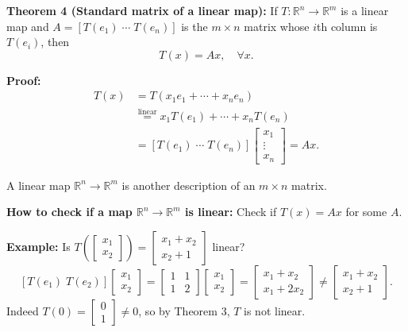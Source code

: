 \documentclass{article}
\begin{document}
\newpage

\textbf{Theorem 4 (Standard matrix of a linear map):} If $T: \mathbb{R}^n \to \mathbb{R}^m$ is a linear map and $A = [T(e_1) \; \cdots \; T(e_n)]$ is the $m \times n$ matrix whose $i$th column is $T(e_i)$, then
\[
T(x) = Ax, \quad \forall x.
\]

\medskip

\textbf{Proof:}
\begin{align*}
T(x) &= T(x_1 e_1 + \cdots + x_n e_n) \\
&\overset{\text{linear}}{=} x_1 T(e_1) + \cdots + x_n T(e_n) \\
&= [T(e_1) \; \cdots \; T(e_n)] \begin{bmatrix} x_1 \\ \vdots \\ x_n \end{bmatrix} = Ax.
\end{align*}

\bigskip

A linear map $\mathbb{R}^n \to \mathbb{R}^m$ is another description of an $m \times n$ matrix.

\medskip

\textbf{How to check if a map $\mathbb{R}^n \to \mathbb{R}^m$ is linear:} Check if $T(x) = Ax$ for some $A$.

\medskip

\textbf{Example:} Is $T\left( \begin{bmatrix} x_1 \\ x_2 \end{bmatrix} \right) = \begin{bmatrix} x_1 + x_2 \\ x_2 + 1 \end{bmatrix}$ linear?
\[
[T(e_1) \; T(e_2)] \begin{bmatrix} x_1 \\ x_2 \end{bmatrix} = \begin{bmatrix} 1 & 1 \\ 1 & 2 \end{bmatrix} \begin{bmatrix} x_1 \\ x_2 \end{bmatrix} = \begin{bmatrix} x_1 + x_2 \\ x_1 + 2x_2 \end{bmatrix} \neq \begin{bmatrix} x_1 + x_2 \\ x_2 + 1 \end{bmatrix}.
\]
Indeed $T(0) = \begin{bmatrix} 0 \\ 1 \end{bmatrix} \neq 0$, so by Theorem 3, $T$ is not linear.
\end{document}
